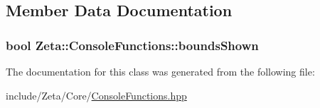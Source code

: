 \subsection{Member Data Documentation}
\hypertarget{classZeta_1_1ConsoleFunctions_ab493f2acca519714be35b1f821d21422}{
\subsubsection[{bounds\+Shown}]{\setlength{\rightskip}{0pt plus 5cm}bool Zeta\+::\+Console\+Functions\+::bounds\+Shown\hspace{0.3cm}{\ttfamily [private]}}}\label{classZeta_1_1ConsoleFunctions_ab493f2acca519714be35b1f821d21422}


The documentation for this class was generated from the following file\+:\begin{DoxyCompactItemize}
\item 
include/\+Zeta/\+Core/\hyperlink{ConsoleFunctions_8hpp}{Console\+Functions.\+hpp}\end{DoxyCompactItemize}
